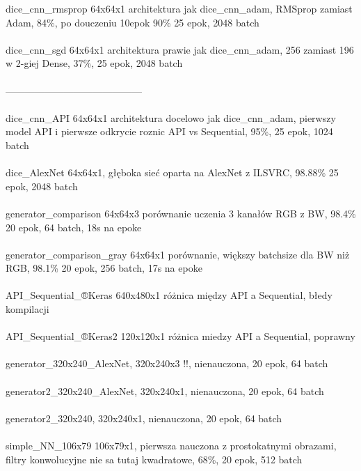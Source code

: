 dice_cnn_rmsprop 64x64x1 architektura jak dice_cnn_adam, RMSprop zamiast Adam, 84\%, po
douczeniu 10epok 90\% 25 epok, 2048 batch \\\\

dice_cnn_sgd 64x64x1 architektura prawie jak dice_cnn_adam, 256 zamiast 196 w 2-giej Dense,
37\%, 25 epok, 2048 batch \\\\
------------------------------------------\\\\
dice_cnn_API 64x64x1 architektura docelowo jak dice_cnn_adam, pierwszy model API i pierwsze
odkrycie roznic API vs Sequential, 95\%, 25 epok, 1024 batch \\\\

dice_AlexNet 64x64x1, głęboka sieć oparta na AlexNet z ILSVRC,  98.88\% 25 epok, 2048 batch \\\\

generator_comparison 64x64x3 porównanie uczenia 3 kanałów RGB z BW, 98.4\% 20 epok, 64 batch, 18s na epoke \\\\

generator_comparison_gray 64x64x1 porównanie, większy batchsize dla BW niż RGB, 98.1\% 20 epok, 256 batch, 17s na epoke \\\\

API_Sequential_®Keras  640x480x1 różnica między API a Sequential, błedy kompilacji \\\\

API_Sequential_®Keras2 120x120x1 różnica miedzy API a Sequential, poprawny \\\\

generator_320x240_AlexNet, 320x240x3 !!, nienauczona, 20 epok, 64 batch \\\\

generator2_320x240_AlexNet, 320x240x1, nienauczona, 20 epok, 64 batch \\\\

generator2_320x240, 320x240x1, nienauczona, 20 epok, 64 batch \\\\

simple_NN_106x79 106x79x1, pierwsza nauczona z prostokatnymi obrazami, filtry konwolucyjne
nie sa tutaj kwadratowe, 68\%, 20 epok, 512 batch \\\\

